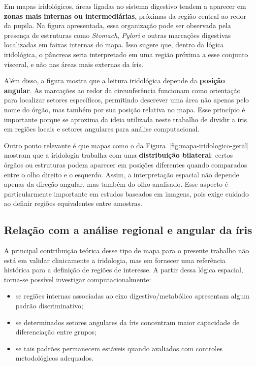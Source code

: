 \documentclass[12pt,a4paper]{article}
\begin{document}
Em mapas iridológicos, áreas ligadas ao sistema digestivo tendem a aparecer em \textbf{zonas mais internas ou intermediárias}, próximas da região central ao redor da pupila. Na figura apresentada, essa organização pode ser observada pela presença de estruturas como \textit{Stomach}, \textit{Pylori} e outras marcações digestivas localizadas em faixas internas do mapa. Isso sugere que, dentro da lógica iridológica, o pâncreas seria interpretado em uma região próxima a esse conjunto visceral, e não nas áreas mais externas da íris.

Além disso, a figura mostra que a leitura iridológica depende da \textbf{posição angular}. As marcações ao redor da circunferência funcionam como orientação para localizar setores específicos, permitindo descrever uma área não apenas pelo nome do órgão, mas também por sua posição relativa no mapa. Esse princípio é importante porque se aproxima da ideia utilizada neste trabalho de dividir a íris em regiões locais e setores angulares para análise computacional.

Outro ponto relevante é que mapas como o da Figura~\ref{fig:mapa-iridologico-geral} mostram que a iridologia trabalha com uma \textbf{distribuição bilateral}: certos órgãos ou estruturas podem aparecer em posições diferentes quando comparados entre o olho direito e o esquerdo. Assim, a interpretação espacial não depende apenas da direção angular, mas também do olho analisado. Esse aspecto é particularmente importante em estudos baseados em imagens, pois exige cuidado ao definir regiões equivalentes entre amostras.

\subsection{Relação com a análise regional e angular da íris}

A principal contribuição teórica desse tipo de mapa para o presente trabalho não está em validar clinicamente a iridologia, mas em fornecer uma referência histórica para a definição de regiões de interesse. A partir dessa lógica espacial, torna-se possível investigar computacionalmente:
\begin{itemize}
    \item se regiões internas associadas ao eixo digestivo/metabólico apresentam algum padrão discriminativo;
    \item se determinados setores angulares da íris concentram maior capacidade de diferenciação entre grupos;
    \item se tais padrões permanecem estáveis quando avaliados com controles metodológicos adequados.
\end{itemize}
\end{document}
